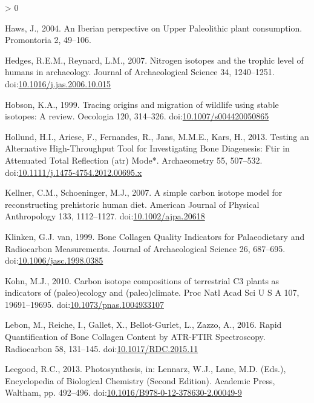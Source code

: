 \documentclass[5p]{elsarticle} %
\newlength{\cslhangindent}
\newenvironment{CSLReferences}[2] %
 {%
  \setlength{\parindent}{0pt}
  \ifodd #1 \everypar{\setlength{\hangindent}{\cslhangindent}}\ignorespaces\fi
  \ifnum #2 > 0
  \setlength{\parskip}{#2\baselineskip}
  \fi
 }%
 {}
\begin{document}
\begin{CSLReferences}{1}{0}
\leavevmode\hypertarget{ref-haws04}{}%
Haws, J., 2004. An {Iberian} perspective on {Upper Paleolithic} plant consumption. Promontoria 2, 49--106.

\leavevmode\hypertarget{ref-hedges_reynard07}{}%
Hedges, R.E.M., Reynard, L.M., 2007. Nitrogen isotopes and the trophic level of humans in archaeology. Journal of Archaeological Science 34, 1240--1251. doi:\href{https://doi.org/10.1016/j.jas.2006.10.015}{10.1016/j.jas.2006.10.015}

\leavevmode\hypertarget{ref-hobson99}{}%
Hobson, K.A., 1999. Tracing origins and migration of wildlife using stable isotopes: A review. Oecologia 120, 314--326. doi:\href{https://doi.org/10.1007/s004420050865}{10.1007/s004420050865}

\leavevmode\hypertarget{ref-hollund_etal13}{}%
Hollund, H.I., Ariese, F., Fernandes, R., Jans, M.M.E., Kars, H., 2013. Testing an {Alternative High}-{Throughput Tool} for {Investigating Bone Diagenesis}: {Ftir} in {Attenuated Total Reflection} (atr) {Mode}*. Archaeometry 55, 507--532. doi:\href{https://doi.org/10.1111/j.1475-4754.2012.00695.x}{10.1111/j.1475-4754.2012.00695.x}

\leavevmode\hypertarget{ref-kellner_schoeninger07}{}%
Kellner, C.M., Schoeninger, M.J., 2007. A simple carbon isotope model for reconstructing prehistoric human diet. American Journal of Physical Anthropology 133, 1112--1127. doi:\href{https://doi.org/10.1002/ajpa.20618}{10.1002/ajpa.20618}

\leavevmode\hypertarget{ref-vanklinken99}{}%
Klinken, G.J. van, 1999. Bone {Collagen Quality Indicators} for {Palaeodietary} and {Radiocarbon Measurements}. Journal of Archaeological Science 26, 687--695. doi:\href{https://doi.org/10.1006/jasc.1998.0385}{10.1006/jasc.1998.0385}

\leavevmode\hypertarget{ref-kohn10}{}%
Kohn, M.J., 2010. Carbon isotope compositions of terrestrial {C3} plants as indicators of (paleo)ecology and (paleo)climate. Proc Natl Acad Sci U S A 107, 19691--19695. doi:\href{https://doi.org/10.1073/pnas.1004933107}{10.1073/pnas.1004933107}

\leavevmode\hypertarget{ref-lebon_etal16}{}%
Lebon, M., Reiche, I., Gallet, X., Bellot-Gurlet, L., Zazzo, A., 2016. Rapid {Quantification} of {Bone Collagen Content} by {ATR}-{FTIR Spectroscopy}. Radiocarbon 58, 131--145. doi:\href{https://doi.org/10.1017/RDC.2015.11}{10.1017/RDC.2015.11}

\leavevmode\hypertarget{ref-leegood13}{}%
Leegood, R.C., 2013. Photosynthesis, in: Lennarz, W.J., Lane, M.D. (Eds.), Encyclopedia of {Biological Chemistry} ({Second Edition}). {Academic Press}, {Waltham}, pp. 492--496. doi:\href{https://doi.org/10.1016/B978-0-12-378630-2.00049-9}{10.1016/B978-0-12-378630-2.00049-9}


\end{CSLReferences}
\end{document}
